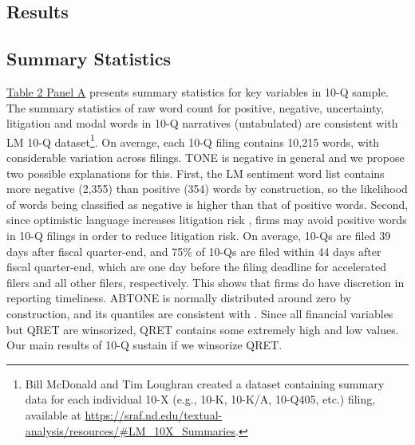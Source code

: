 \documentclass[a4paper]{article}
\begin{document}
\begin{spacing}{2}
\section{Results}
\subsection{Summary Statistics}
\hyperref[T2PA]{Table 2 Panel A} presents summary statistics for key variables in 10-Q sample. The summary statistics of raw word count for positive, negative, uncertainty, litigation and modal words in 10-Q narratives (untabulated) are consistent with LM 10-Q dataset\footnote{Bill McDonald and Tim Loughran created a dataset containing summary data for each individual 10-X (e.g., 10-K, 10-K/A, 10-Q405, etc.) filing, available at \url{https://sraf.nd.edu/textual-analysis/resources/\#LM_10X_Summaries}.}. On average, each 10-Q filing contains 10,215 words, with considerable variation across filings. TONE is negative in general and we propose two possible explanations for this. First, the LM sentiment word list contains more negative (2,355) than positive (354) words by construction, so the likelihood of words being classified as negative is higher than that of positive words. Second, since optimistic language increases litigation risk \citep{rogersDisclosureToneShareholder2011, cazierWhenAreFirms2020}, firms may avoid positive words in 10-Q filings in order to reduce litigation risk. On average, 10-Qs are filed 39 days after fiscal quarter-end, and 75\% of 10-Qs are filed within 44 days after fiscal quarter-end, which are one day before the filing deadline for accelerated filers and all other filers, respectively. This shows that firms do have discretion in reporting timeliness. ABTONE is normally distributed around zero by construction, and its quantiles are consistent with \citet{huangToneManagement2014}. Since all financial variables but QRET are winsorized, QRET contains some extremely high and low values. Our main results of 10-Q sustain if we winsorize QRET.


\end{spacing}
\end{document}
